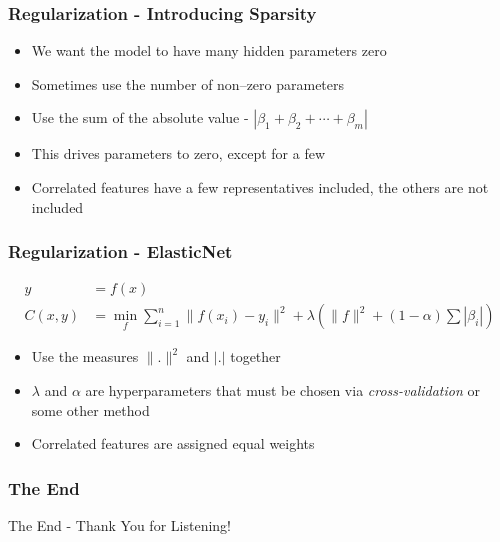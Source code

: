 \documentclass{beamer}
\begin{document}
\begin{frame}
\frametitle{Regularization - Introducing Sparsity}
\begin{itemize}
\item We want the model to have many hidden parameters zero
\item Sometimes use the number of non--zero parameters
\item Use the sum of the absolute value - $| \beta_1 + \beta_2 + \cdots + \beta_m |$
\item This drives parameters to zero, except for a few
\item Correlated features have a few representatives included, the others are not included
\end{itemize}
\end{frame}

\begin{frame}
\frametitle{Regularization - ElasticNet}
\begin{align}
y &= f(x) \\
C(x, y) &= \min_f \sum_{i=1}^{n} \| f(x_i) - y_i \|^2 + \lambda \left( \| f \|^2 + (1 - \alpha) \sum \left| \beta_i \right| \right)
\end{align}
\begin{itemize}
\item Use the measures $\|. \|^2$ and $|.|$ together
\item $\lambda$ and $\alpha$ are hyperparameters that must be chosen via \textit{cross-validation} or some other method
\item Correlated features are assigned equal weights
\end{itemize}
\end{frame}


\begin{frame}
\frametitle{The End}
\Huge{\centerline{The End - Thank You for Listening!}}
\end{frame}

\end{document}
